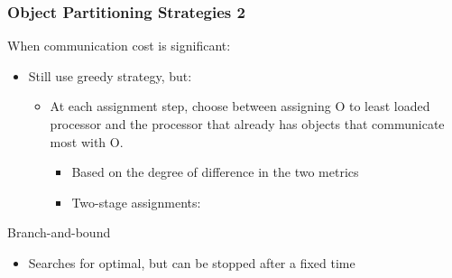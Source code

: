 \begin{frame}[fragile]
\frametitle{Object Partitioning Strategies 2}
When communication cost is significant:
\begin{itemize}
 \item Still use greedy strategy, but:
 \begin{itemize}
  \item At each assignment step, choose between assigning O to least loaded processor and the processor that already has objects that communicate most with O.
  \begin{itemize}
   \item Based on the degree of difference in the two metrics
   \item Two-stage assignments:
  \end{itemize}
 \end{itemize}
\end{itemize}
Branch-and-bound
\begin{itemize}
 \item Searches for optimal, but can be stopped after a fixed time
\end{itemize}
\end{frame}

